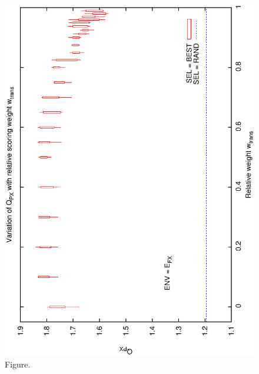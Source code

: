 \documentclass[12pt,a4paper]{article}
\begin{document}
\begin{figure}[htbp]
 \begin{center}
  \includegraphics[scale=1.0, angle=0]{figures/cs1_dw2_px.eps}
 \end{center}
  \caption[Figure.]
{Figure.}
\end{figure}
\clearpage
\end{document}
